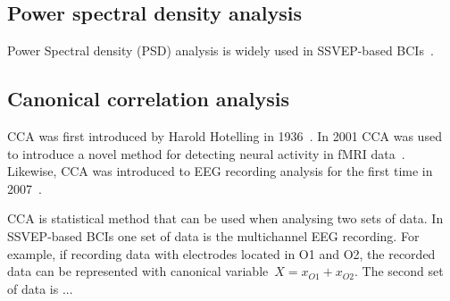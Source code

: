 \subsection{Power spectral density analysis}

Power Spectral density (PSD) analysis is widely used in \gls{SSVEP}-based \glspl{BCI}~\cite{bin2009cca}.

\subsection{Canonical correlation analysis}

\Gls{CCA} was first introduced by Harold Hotelling in 1936~\cite{cca_hotelling}. In 2001 \gls{CCA} was used to introduce a novel method for detecting neural activity in \gls{fMRI} data~\cite{cca_fmri}. Likewise, \gls{CCA} was introduced to \gls{EEG} recording analysis for the first time in 2007~\cite{cca_lin}. 

\Gls{CCA} is statistical method that can be used when analysing two sets of data. In \gls{SSVEP}-based \glspl{BCI} one set of data is the multichannel \gls{EEG} recording. For example, if recording data with electrodes located in O1 and O2, the recorded data can be represented with canonical variable~$X=x_{O1}+x_{O2}$. The second set of data is ...
